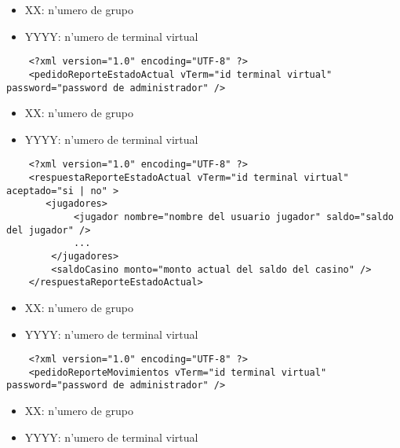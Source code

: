  
\begin{itemize}
    \item{XX: n'umero de grupo}
    \item{YYYY: n'umero de terminal virtual}
\end{itemize}

\begin{verbatim}
    <?xml version="1.0" encoding="UTF-8" ?>
    <pedidoReporteEstadoActual vTerm="id terminal virtual" password="password de administrador" />
\end{verbatim}


 
\begin{itemize}
    \item{XX: n'umero de grupo}
    \item{YYYY: n'umero de terminal virtual}
\end{itemize}

\begin{verbatim}
    <?xml version="1.0" encoding="UTF-8" ?>
    <respuestaReporteEstadoActual vTerm="id terminal virtual" aceptado="si | no" >
       <jugadores>
            <jugador nombre="nombre del usuario jugador" saldo="saldo del jugador" />
            ... 
        </jugadores>
        <saldoCasino monto="monto actual del saldo del casino" />
    </respuestaReporteEstadoActual>
\end{verbatim}



 
\begin{itemize}
    \item{XX: n'umero de grupo}
    \item{YYYY: n'umero de terminal virtual}
\end{itemize}

\begin{verbatim}
    <?xml version="1.0" encoding="UTF-8" ?>
    <pedidoReporteMovimientos vTerm="id terminal virtual" password="password de administrador" />
\end{verbatim}


 
\begin{itemize}
    \item{XX: n'umero de grupo}
    \item{YYYY: n'umero de terminal virtual}
\end{itemize}

